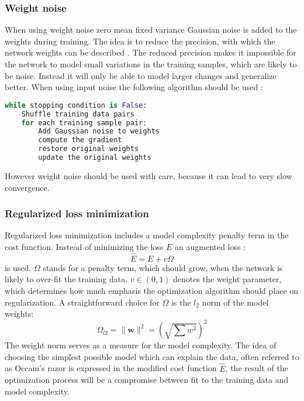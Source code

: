 \subsubsection{Weight noise}
When using weight noise zero mean fixed variance Gaussian noise is added to the weights during training. The idea is to reduce the precision, with which the network weights can be described \cite[page 32]{Graves2012}. The reduced precision makes it impossible for the network to model small variations in the training samples, which are likely to be noise. Instead it will only be able to model larger changes and generalize better.
When using input noise the following algorithm should be used \cite[page 33]{Graves2012}:
\begin{lstlisting}[language=python]
while stopping condition is False:
    Shuffle training data pairs
    for each training sample pair:
        Add Gaussian noise to weights
        compute the gradient
        restore original weights
        update the original weights
\end{lstlisting}
However weight noise should be used with care, because it can lead to very slow convergence.

\subsubsection{Regularized loss minimization}
Regularized loss minimization includes a model complexity penalty term in the cost function. Instead of minimizing the loss $E$ an augmented loss \cite[p. 338]{Bishop1995}\cite[p. 171]{Ben-david2014}:
\begin{equation}
\hat{E} = E + v\Omega
\end{equation}
is used. $\Omega$ stands for a penalty term, which should grow, when the network is likely to over-fit the training data. $v \in (0,1)$ denotes the weight parameter, which determines how much emphasis the optimization algorithm should place on regularization. A straightforward choice for $\Omega$ is the $l_2$ norm of the model weights:
\begin{equation}
\Omega_{l2} = \|\mathbf{w}\|^2 = (\sqrt{ \sum w^2})^2
\end{equation}
The weight norm serves as a measure for the model complexity. The idea of choosing the simplest possible model which can explain the data, often referred to as Occam's razor is expressed in the modified cost function $\hat{E}$, the result of the optimization process will be a compromise between fit to the training data and model complexity.


